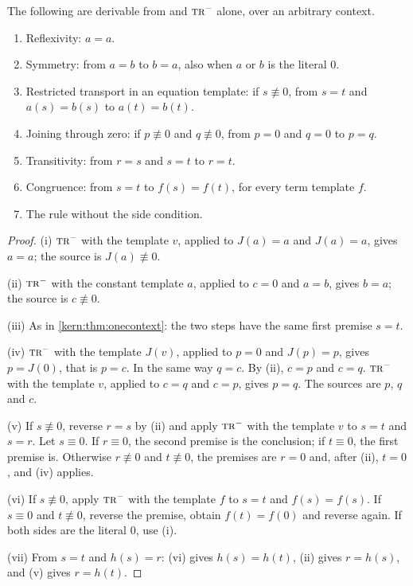 \begin{lemma}
\label{kern:lem:oseq}
The following are derivable from  and $\rulename{Tr}^{-}$ alone,
over an arbitrary context.
\begin{enumerate}[label=\textup{(\roman*)}]
\item Reflexivity: $a=a$.
\item Symmetry: from $a=b$ to $b=a$, also when $a$ or $b$ is the literal
 $0$.
\item Restricted transport in an equation template: if $s\not\equiv 0$,
 from $s=t$ and $a(s)=b(s)$ to $a(t)=b(t)$.
\item Joining through zero: if $p\not\equiv 0$ and $q\not\equiv 0$, from
 $p=0$ and $q=0$ to $p=q$.
\item Transitivity: from $r=s$ and $s=t$ to $r=t$.
\item Congruence: from $s=t$ to $f(s)=f(t)$, for every term template $f$.
\item The rule  without the side condition.
\end{enumerate}
\end{lemma}

\begin{proof}
(i) $\rulename{Tr}^{-}$ with the template $v$, applied to $J(a)=a$ and
$J(a)=a$, gives $a=a$; the source is $J(a)\not\equiv 0$.

(ii) $\rulename{Tr}^{-}$ with the constant template $a$, applied to $c=0$
and $a=b$, gives $b=a$; the source is $c\not\equiv 0$.

(iii) As in \cref{kern:thm:onecontext}: the two steps have the same first
premise $s=t$.

(iv) $\rulename{Tr}^{-}$ with the template $J(v)$, applied to $p=0$ and
$J(p)=p$, gives $p=J(0)$, that is $p=c$.  In the same way $q=c$.  By (ii),
$c=p$ and $c=q$.  $\rulename{Tr}^{-}$ with the template $v$, applied to
$c=q$ and $c=p$, gives $p=q$.  The sources are $p$, $q$ and $c$.

(v) If $s\not\equiv 0$, reverse $r=s$ by (ii) and apply $\rulename{Tr}^{-}$
with the template $v$ to $s=t$ and $s=r$.  Let $s\equiv 0$.  If $r\equiv 0$,
the second premise is the conclusion; if $t\equiv 0$, the first premise is.
Otherwise $r\not\equiv 0$ and $t\not\equiv 0$, the premises are $r=0$ and,
after (ii), $t=0$, and (iv) applies.

(vi) If $s\not\equiv 0$, apply $\rulename{Tr}^{-}$ with the template $f$ to
$s=t$ and $f(s)=f(s)$.  If $s\equiv 0$ and $t\not\equiv 0$, reverse the
premise, obtain $f(t)=f(0)$ and reverse again.  If both sides are the
literal $0$, use (i).

(vii) From $s=t$ and $h(s)=r$: (vi) gives $h(s)=h(t)$, (ii) gives $r=h(s)$,
and (v) gives $r=h(t)$.
\end{proof}


